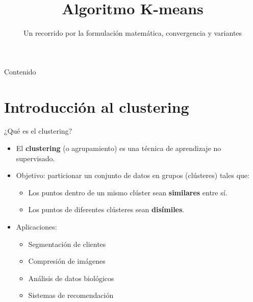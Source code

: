 \documentclass[aspectratio=169]{beamer}
\title{Algoritmo K-means}
\subtitle{Un recorrido por la formulación matemática, convergencia y variantes}
\author{}
\date{}
\begin{document}
\begin{frame}
    \titlepage
\end{frame}

\begin{frame}{Contenido}
    \tableofcontents
\end{frame}

\section{Introducción al clustering}

\begin{frame}{¿Qué es el clustering?}
    \begin{itemize}
        \item El \textbf{clustering} (o agrupamiento) es una técnica de aprendizaje no supervisado.
        \item Objetivo: particionar un conjunto de datos en grupos (clústeres) tales que:
        \begin{itemize}
            \item Los puntos dentro de un mismo clúster sean \textbf{similares} entre sí.
            \item Los puntos de diferentes clústeres sean \textbf{disímiles}.
        \end{itemize}
        \item Aplicaciones:
        \begin{itemize}
            \item Segmentación de clientes
            \item Compresión de imágenes
            \item Análisis de datos biológicos
            \item Sistemas de recomendación
        \end{itemize}
    \end{itemize}
    
    \begin{center}
\end{center}
\end{frame}
\end{document}
